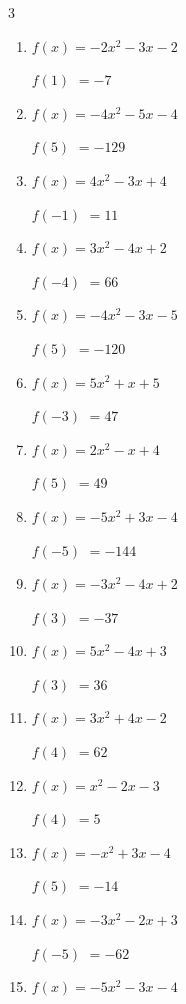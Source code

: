 \begin{multicols}{3}
\begin{enumerate}
$f(3)$
        $= -23$

\columnbreak %

  \item $f(x)=-2x^{2}-3x-2$

$f(1)$
        $= -7$

  \item $f(x)=-4x^{2}-5x-4$

$f(5)$
        $= -129$

  \item $f(x)=4x^{2}-3x+4$

$f(-1)$
        $= 11$

  \item $f(x)=3x^{2}-4x+2$

$f(-4)$
        $= 66$

  \item $f(x)=-4x^{2}-3x-5$

$f(5)$
        $= -120$

  \item $f(x)=5x^{2}+x+5$

$f(-3)$
        $= 47$

  \item $f(x)=2x^{2}-x+4$

$f(5)$
        $= 49$

  \item $f(x)=-5x^{2}+3x-4$

$f(-5)$
        $= -144$

  \item $f(x)=-3x^{2}-4x+2$

$f(3)$
        $= -37$

  \item $f(x)=5x^{2}-4x+3$

$f(3)$
        $= 36$

  \item $f(x)=3x^{2}+4x-2$

$f(4)$
        $= 62$

  \item $f(x)=x^{2}-2x-3$

$f(4)$
        $= 5$

  \item $f(x)=-x^{2}+3x-4$

$f(5)$
        $= -14$

  \item $f(x)=-3x^{2}-2x+3$

$f(-5)$
        $= -62$

  \item $f(x)=-5x^{2}-3x-4$


\end{enumerate}
\end{multicols}
